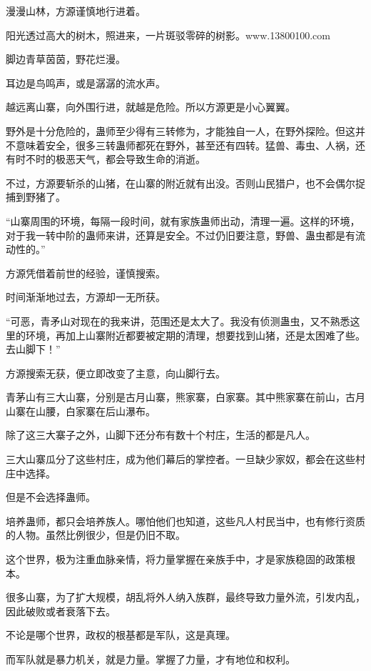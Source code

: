 
\begin{this_body}

漫漫山林，方源谨慎地行进着。

阳光透过高大的树木，照进来，一片斑驳零碎的树影。www.13800100.com

脚边青草茵茵，野花烂漫。

耳边是鸟鸣声，或是潺潺的流水声。

越远离山寨，向外围行进，就越是危险。所以方源更是小心翼翼。

野外是十分危险的，蛊师至少得有三转修为，才能独自一人，在野外探险。但这并不意味着安全，很多三转蛊师都死在野外，甚至还有四转。猛兽、毒虫、人祸，还有时不时的极恶天气，都会导致生命的消逝。

不过，方源要斩杀的山猪，在山寨的附近就有出没。否则山民猎户，也不会偶尔捉捕到野猪了。

“山寨周围的环境，每隔一段时间，就有家族蛊师出动，清理一遍。这样的环境，对于我一转中阶的蛊师来讲，还算是安全。不过仍旧要注意，野兽、蛊虫都是有流动性的。”

方源凭借着前世的经验，谨慎搜索。

时间渐渐地过去，方源却一无所获。

“可恶，青矛山对现在的我来讲，范围还是太大了。我没有侦测蛊虫，又不熟悉这里的环境，再加上山寨附近都要被定期的清理，想要找到山猪，还是太困难了些。去山脚下！”

方源搜索无获，便立即改变了主意，向山脚行去。

青茅山有三大山寨，分别是古月山寨，熊家寨，白家寨。其中熊家寨在前山，古月山寨在山腰，白家寨在后山瀑布。

除了这三大寨子之外，山脚下还分布有数十个村庄，生活的都是凡人。

三大山寨瓜分了这些村庄，成为他们幕后的掌控者。一旦缺少家奴，都会在这些村庄中选择。

但是不会选择蛊师。

培养蛊师，都只会培养族人。哪怕他们也知道，这些凡人村民当中，也有修行资质的人物。虽然比例很少，但是仍旧不取。

这个世界，极为注重血脉亲情，将力量掌握在亲族手中，才是家族稳固的政策根本。

很多山寨，为了扩大规模，胡乱将外人纳入族群，最终导致力量外流，引发内乱，因此破败或者衰落下去。

不论是哪个世界，政权的根基都是军队，这是真理。

而军队就是暴力机关，就是力量。掌握了力量，才有地位和权利。


\end{this_body}
